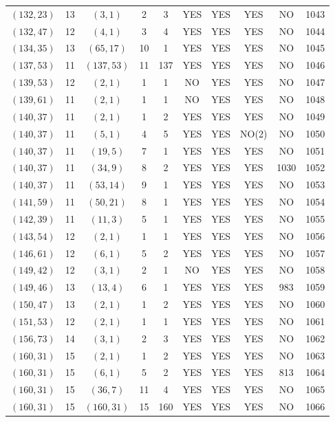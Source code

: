 \begin{longtable}{|c|c|c|c|c|c|c|c|c|c|}
$(132, 23)$ & 13 & $(3, 1)$ & 2 & 3 & YES & YES & YES & NO & 1043\\
$(132, 47)$ & 12 & $(4, 1)$ & 3 & 4 & YES & YES & YES & NO & 1044\\
$(134, 35)$ & 13 & $(65, 17)$ & 10 & 1 & YES & YES & YES & NO & 1045\\
$(137, 53)$ & 11 & $(137, 53)$ & 11 & 137 & YES & YES & YES & NO & 1046\\
$(139, 53)$ & 12 & $(2, 1)$ & 1 & 1 & NO & YES & YES & NO & 1047\\
$(139, 61)$ & 11 & $(2, 1)$ & 1 & 1 & NO & YES & YES & NO & 1048\\
$(140, 37)$ & 11 & $(2, 1)$ & 1 & 2 & YES & YES & YES & NO & 1049\\
$(140, 37)$ & 11 & $(5, 1)$ & 4 & 5 & YES & YES & NO(2) & NO & 1050\\
$(140, 37)$ & 11 & $(19, 5)$ & 7 & 1 & YES & YES & YES & NO & 1051\\
$(140, 37)$ & 11 & $(34, 9)$ & 8 & 2 & YES & YES & YES & 1030 & 1052\\
$(140, 37)$ & 11 & $(53, 14)$ & 9 & 1 & YES & YES & YES & NO & 1053\\
$(141, 59)$ & 11 & $(50, 21)$ & 8 & 1 & YES & YES & YES & NO & 1054\\
$(142, 39)$ & 11 & $(11, 3)$ & 5 & 1 & YES & YES & YES & NO & 1055\\
$(143, 54)$ & 12 & $(2, 1)$ & 1 & 1 & YES & YES & YES & NO & 1056\\
$(146, 61)$ & 12 & $(6, 1)$ & 5 & 2 & YES & YES & YES & NO & 1057\\
$(149, 42)$ & 12 & $(3, 1)$ & 2 & 1 & NO & YES & YES & NO & 1058\\
$(149, 46)$ & 13 & $(13, 4)$ & 6 & 1 & YES & YES & YES & 983 & 1059\\
$(150, 47)$ & 13 & $(2, 1)$ & 1 & 2 & YES & YES & YES & NO & 1060\\
$(151, 53)$ & 12 & $(2, 1)$ & 1 & 1 & YES & YES & YES & NO & 1061\\
$(156, 73)$ & 14 & $(3, 1)$ & 2 & 3 & YES & YES & YES & NO & 1062\\
$(160, 31)$ & 15 & $(2, 1)$ & 1 & 2 & YES & YES & YES & NO & 1063\\
$(160, 31)$ & 15 & $(6, 1)$ & 5 & 2 & YES & YES & YES & 813 & 1064\\
$(160, 31)$ & 15 & $(36, 7)$ & 11 & 4 & YES & YES & YES & NO & 1065\\
$(160, 31)$ & 15 & $(160, 31)$ & 15 & 160 & YES & YES & YES & NO & 1066\\

\end{longtable}
